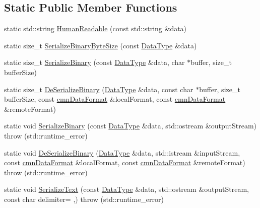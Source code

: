 \subsection*{Static Public Member Functions}
\begin{DoxyCompactItemize}
\item 
static std\+::string \hyperlink{classcmn_data_3_01std_1_1string_01_4_ab72e4cd237cd5e96082f78de567e7f3d}{Human\+Readable} (const std\+::string \&data)
\item 
static size\+\_\+t \hyperlink{classcmn_data_3_01std_1_1string_01_4_a79f235f21898f0dd6a1a06b004376cd3}{Serialize\+Binary\+Byte\+Size} (const \hyperlink{classcmn_data_3_01std_1_1string_01_4_a04ffa92a93dc010ed2bf5bf19e2d0fdd}{Data\+Type} \&data)
\item 
static size\+\_\+t \hyperlink{classcmn_data_3_01std_1_1string_01_4_a4d9477de95262309f00ddacba4eb0c7e}{Serialize\+Binary} (const \hyperlink{classcmn_data_3_01std_1_1string_01_4_a04ffa92a93dc010ed2bf5bf19e2d0fdd}{Data\+Type} \&data, char $\ast$buffer, size\+\_\+t buffer\+Size)
\item 
static size\+\_\+t \hyperlink{classcmn_data_3_01std_1_1string_01_4_acbeb843828f9b208ed26168c062c5667}{De\+Serialize\+Binary} (\hyperlink{classcmn_data_3_01std_1_1string_01_4_a04ffa92a93dc010ed2bf5bf19e2d0fdd}{Data\+Type} \&data, const char $\ast$buffer, size\+\_\+t buffer\+Size, const \hyperlink{classcmn_data_format}{cmn\+Data\+Format} \&local\+Format, const \hyperlink{classcmn_data_format}{cmn\+Data\+Format} \&remote\+Format)
\item 
static void \hyperlink{classcmn_data_3_01std_1_1string_01_4_a3da6817f8e087699209c649e5061c909}{Serialize\+Binary} (const \hyperlink{classcmn_data_3_01std_1_1string_01_4_a04ffa92a93dc010ed2bf5bf19e2d0fdd}{Data\+Type} \&data, std\+::ostream \&output\+Stream)  throw (std\+::runtime\+\_\+error)
\item 
static void \hyperlink{classcmn_data_3_01std_1_1string_01_4_a1fbbb3421661a7cc5220e484dfeba7fb}{De\+Serialize\+Binary} (\hyperlink{classcmn_data_3_01std_1_1string_01_4_a04ffa92a93dc010ed2bf5bf19e2d0fdd}{Data\+Type} \&data, std\+::istream \&input\+Stream, const \hyperlink{classcmn_data_format}{cmn\+Data\+Format} \&local\+Format, const \hyperlink{classcmn_data_format}{cmn\+Data\+Format} \&remote\+Format)  throw (std\+::runtime\+\_\+error)
\item 
static void \hyperlink{classcmn_data_3_01std_1_1string_01_4_a064c3fce632bc2558828502e2a1ccbcf}{Serialize\+Text} (const \hyperlink{classcmn_data_3_01std_1_1string_01_4_a04ffa92a93dc010ed2bf5bf19e2d0fdd}{Data\+Type} \&data, std\+::ostream \&output\+Stream, const char delimiter= \textquotesingle{},\textquotesingle{})  throw (std\+::runtime\+\_\+error)

\end{DoxyCompactItemize}
